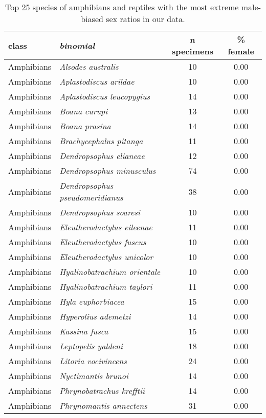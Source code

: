 \begin{longtable}{l>{\itshape}lcc}
\caption{Top 25 species of amphibians and reptiles with the most extreme male-biased sex ratios
                  in our data.} \\ 
  \hline
class & binomial & n specimens & \% female \\ 
  \hline
Amphibians & Alsodes australis &  10 & 0.00 \\ 
  Amphibians & Aplastodiscus arildae &  10 & 0.00 \\ 
  Amphibians & Aplastodiscus leucopygius &  14 & 0.00 \\ 
  Amphibians & Boana curupi &  13 & 0.00 \\ 
  Amphibians & Boana prasina &  14 & 0.00 \\ 
  Amphibians & Brachycephalus pitanga &  11 & 0.00 \\ 
  Amphibians & Dendropsophus elianeae &  12 & 0.00 \\ 
  Amphibians & Dendropsophus minusculus &  74 & 0.00 \\ 
  Amphibians & Dendropsophus pseudomeridianus &  38 & 0.00 \\ 
  Amphibians & Dendropsophus soaresi &  10 & 0.00 \\ 
  Amphibians & Eleutherodactylus eileenae &  11 & 0.00 \\ 
  Amphibians & Eleutherodactylus fuscus &  10 & 0.00 \\ 
  Amphibians & Eleutherodactylus unicolor &  10 & 0.00 \\ 
  Amphibians & Hyalinobatrachium orientale &  10 & 0.00 \\ 
  Amphibians & Hyalinobatrachium taylori &  11 & 0.00 \\ 
  Amphibians & Hyla euphorbiacea &  15 & 0.00 \\ 
  Amphibians & Hyperolius ademetzi &  14 & 0.00 \\ 
  Amphibians & Kassina fusca &  15 & 0.00 \\ 
  Amphibians & Leptopelis yaldeni &  18 & 0.00 \\ 
  Amphibians & Litoria vocivincens &  24 & 0.00 \\ 
  Amphibians & Nyctimantis brunoi &  14 & 0.00 \\ 
  Amphibians & Phrynobatrachus krefftii &  14 & 0.00 \\ 
  Amphibians & Phrynomantis annectens &  31 & 0.00 \\ 

\end{longtable}
